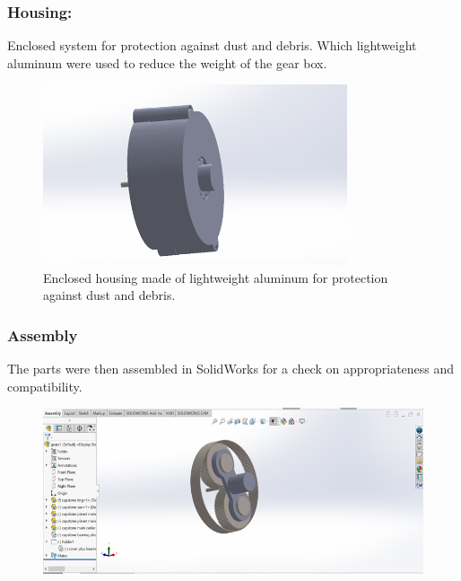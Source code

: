 \documentclass[../../main]{subfiles}
\begin{document}
\subsubsection{Housing:} 
Enclosed system for protection against dust and debris.
Which lightweight aluminum were used to reduce the weight of the gear
box.
\begin{figure}[h]
  \centering
  \includegraphics[width=0.8\textwidth]{sublatex/Opryrmi/media/image5.png} 
  \caption[Aluminum Housing for Dust Protection]{Enclosed housing made of lightweight aluminum for protection against dust and debris.}
\end{figure}

\newpage
\subsubsection{Assembly}

The parts were then assembled in SolidWorks for a check on
appropriateness and \\ compatibility.
\begin{figure}[h]
  \centering
\includegraphics[width=\textwidth]{sublatex/Opryrmi/media/image6.png}
\caption{}
\end{figure}
\end{document}
